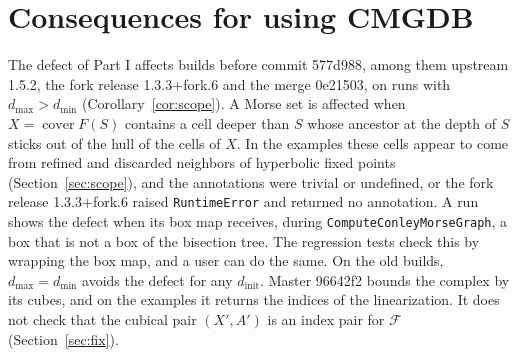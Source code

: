 \documentclass[11pt]{article}
\theoremstyle{plain}
\theoremstyle{definition}
\theoremstyle{remark}
\DeclareMathOperator{\cover}{cover}
\newcommand{\Fc}{\mathcal{F}}
\newcommand{\dmin}{d_{\min}}
\newcommand{\dmax}{d_{\max}}
\newcommand{\dinit}{d_{\mathrm{init}}}
\newcommand{\code}[1]{\texttt{#1}}
\begin{document}
\section{Consequences for using CMGDB}\label{sec:consequences}

The defect of Part I affects builds before commit 577d988, among them upstream 1.5.2, the fork release 1.3.3+fork.6 and the merge 0e21503, on runs with $\dmax>\dmin$ (Corollary~\ref{cor:scope}). A Morse set is affected when $X=\cover F(S)$ contains a cell deeper than $S$ whose ancestor at the depth of $S$ sticks out of the hull of the cells of $X$. In the examples these cells appear to come from refined and discarded neighbors of hyperbolic fixed points (Section~\ref{sec:scope}), and the annotations were trivial or undefined, or the fork release 1.3.3+fork.6 raised \code{RuntimeError} and returned no annotation. A run shows the defect when its box map receives, during \code{ComputeConleyMorseGraph}, a box that is not a box of the bisection tree. The regression tests check this by wrapping the box map, and a user can do the same. On the old builds, $\dmax=\dmin$ avoids the defect for any $\dinit$. Master 96642f2 bounds the complex by its cubes, and on the examples it returns the indices of the linearization. It does not check that the cubical pair $(X',A')$ is an index pair for $\Fc$ (Section~\ref{sec:fix}).
\end{document}
